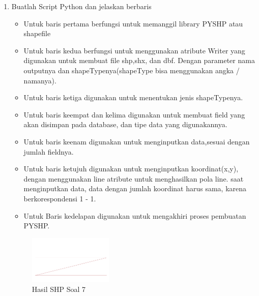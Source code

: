 \begin{enumerate}
	\item Buatlah Script Python dan jelaskan berbaris
	
	\begin{itemize}
		\item Untuk baris pertama berfungsi untuk memanggil library PYSHP atau shapefile
		\item Untuk baris kedua berfungsi untuk menggunakan atribute Writer yang digunakan untuk membuat file shp,shx, dan dbf. \hfill\break Dengan parameter nama outputnya dan shapeTypenya(shapeType bisa menggunakan angka / namanya).
		\item Untuk baris ketiga digunakan untuk menentukan jenis shapeTypenya.
		\item Untuk baris keempat dan kelima digunakan untuk membuat field yang akan disimpan pada database, dan tipe data yang digunakannya.
		\item Untuk baris keenam digunakan untuk menginputkan data,sesuai dengan jumlah fieldnya.
		\item Untuk baris ketujuh digunakan untuk menginputkan koordinat(x,y), dengan menggunakan line atribute untuk menghasilkan pola line. \hfill\break
		saat menginputkan data, data dengan jumlah koordinat harus sama, karena berkorespondensi 1 - 1.
		\item Untuk Baris kedelapan digunakan untuk mengakhiri proses pembuatan PYSHP.
	\end{itemize}
	\hfill\break
	\begin{figure}[H]
		\includegraphics[width=4cm]{figures/1174027/2/soal7.png}
		\centering
		\caption{Hasil SHP Soal 7}
	\end{figure}


\end{enumerate}
